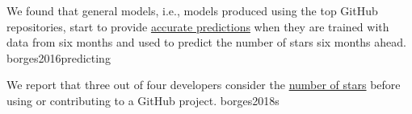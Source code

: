 \documentclass{article}
\begin{document}
  {We found that general models, i.e., models produced using the top GitHub repositories, start to provide \ul{accurate predictions} when they are trained with data from six months and used to predict the number of stars six months ahead.}
  {borges2016predicting}

  {We report that three out of four developers consider the \ul{number of stars} before using or contributing to a GitHub project.}
  {borges2018s}
\end{document}
